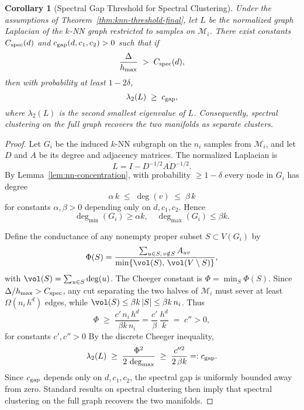 \documentclass{article}
\theoremstyle{plain}
\newtheorem{corollary}[theorem]{Corollary}
\theoremstyle{definition}
\theoremstyle{remark}
\begin{document}
\begin{corollary}[Spectral Gap Threshold for Spectral Clustering] \label{app:corollary-spectral-gap}
Under the assumptions of Theorem~\ref{thm:knn-threshold-final}, let \(L\) be the normalized graph Laplacian of the \(k\)-NN graph restricted to samples on \(\mathcal{M}_i\).  There exist constants \(C_{\rm spec}(d)\) and \(c_{\rm gap}(d,c_1,c_2)>0\) such that if
\[
  \frac{\Delta}{h_{\max}} \;>\; C_{\rm spec}(d),
\]
then with probability at least \(1-2\delta\),
\[
  \lambda_2(L) \;\ge\; c_{\rm gap},
\]
where \(\lambda_2(L)\) is the second smallest eigenvalue of \(L\).  Consequently, spectral clustering on the full graph recovers the two manifolds as separate clusters.
\end{corollary}

\begin{proof}
Let \(G_i\) be the induced \(k\)-NN subgraph on the \(n_i\) samples from \(\mathcal{M}_i\), and let \(D\) and \(A\) be its degree and adjacency matrices.  The normalized Laplacian is
\[
  L = I - D^{-1/2} A D^{-1/2}.
\]
By Lemma~\ref{lem:nn-concentration}, with probability \(\ge1-\delta\) every node in \(G_i\) has degree
\[
  \alpha\,k \;\le\; \deg(v) \;\le\; \beta\,k
\]
for constants \(\alpha,\beta>0\) depending only on \(d,c_1,c_2\).  Hence
\[
  \deg_{\min}(G_i)\ge \alpha k,
  \quad
  \deg_{\max}(G_i)\le \beta k.
\]

Define the conductance of any nonempty proper subset \(S\subset V(G_i)\) by
\[
  \Phi(S) = \frac{\sum_{u\in S,\,v\notin S} A_{uv}}%
                   {\min\{\vol(S),\,\vol(V\setminus S)\}},
\]
with \(\vol(S)=\sum_{u\in S}\deg(u)\).  The Cheeger constant is 
\(\Phi = \min_{S}\Phi(S)\).  Since \(\Delta/h_{\max}>C_{\rm spec}\), any cut separating the two halves of \(\mathcal{M}_i\) must sever at least
\(\Omega(n_i\,h^d)\)
edges, while \(\vol(S)\le \beta k\,|S|\le \beta k\,n_i\).  Thus
\[
  \Phi \;\ge\; \frac{c'\,n_i\,h^d}{\beta k\,n_i}
           = \frac{c'}{\beta}\,\frac{h^d}{k}
           \;=\; c''>0,
\]
for constants \(c',c''>0\) 
By the discrete Cheeger inequality,
\[
  \lambda_2(L)\;\ge\;\frac{\Phi^2}{2\,\deg_{\max}}
                 \;\ge\;\frac{c''^2}{2\,\beta k}
                 =: c_{\rm gap}.
\]
Since \(c_{\rm gap}\) depends only on \(d,c_1,c_2\), the spectral gap is uniformly bounded away from zero.  Standard results on spectral clustering then imply that spectral clustering on the full graph recovers the two manifolds.
\end{proof}
\end{document}
